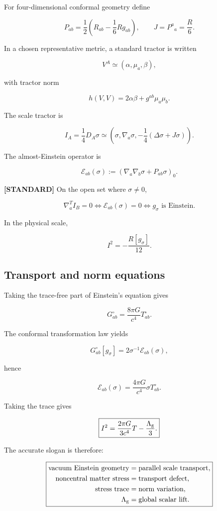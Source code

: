 \documentclass[
  11pt,
  letterpaper,
]{article}
\begin{document}
For four-dimensional conformal geometry define

\[
P_{ab}=\frac12\left(R_{ab}-\frac16Rg_{ab}\right),
\qquad
J=P^a{}_a=\frac{R}{6}.
\]

In a chosen representative metric, a standard tractor is written

\[
V^A\simeq(\alpha,\mu_a,\beta),
\]

with tractor norm

\[
h(V,V)=2\alpha\beta+g^{ab}\mu_a\mu_b.
\]

The scale tractor is

\[
\boxed{
I_A=\frac14D_A\sigma
\simeq
\left(
\sigma,
\nabla_a\sigma,
-\frac14(\Delta\sigma+J\sigma)
\right).
}
\]

The almost-Einstein operator is

\[
\boxed{
\mathcal E_{ab}(\sigma)
:=\left(\nabla_a\nabla_b\sigma+P_{ab}\sigma\right)_0.
}
\]

\textbf{{[}STANDARD{]}} On the open set where \(\sigma\neq0\),

\[
\nabla_a^TI_B=0
\Longleftrightarrow
\mathcal E_{ab}(\sigma)=0
\Longleftrightarrow
g_\sigma\text{ is Einstein}.
\]

In the physical scale,

\[
\boxed{I^2=-\frac{R[g_\sigma]}{12}.}
\]

\subsection{Transport and norm
equations}\label{transport-and-norm-equations}

Taking the trace-free part of Einstein's equation gives

\[
G^{\circ}_{ab}=\frac{8\pi G}{c^4}T^{\circ}_{ab}.
\]

The conformal transformation law yields

\[
G^{\circ}_{ab}[g_\sigma]
=2\sigma^{-1}\mathcal E_{ab}(\sigma),
\]

hence

\[
\boxed{
\mathcal E_{ab}(\sigma)
=\frac{4\pi G}{c^4}\sigma T^{\circ}_{ab}.
}
\]

Taking the trace gives

\[
\boxed{
I^2=\frac{2\pi G}{3c^4}T-\frac{\Lambda_{\rm g}}3.
}
\]

The accurate slogan is therefore:

\[
\boxed{
\begin{aligned}
\text{vacuum Einstein geometry}
&=\text{parallel scale transport},\\
\text{noncentral matter stress}
&=\text{transport defect},\\
\text{stress trace}
&=\text{norm variation},\\
\Lambda_{\rm g}
&=\text{global scalar lift}.
\end{aligned}}
\]
\end{document}
